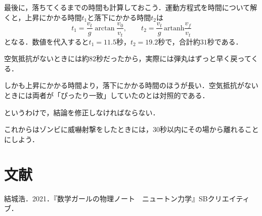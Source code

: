 \documentclass[a4paper,12pt]{jarticle}
\theoremstyle{definition}%
\newcommand{\bib}{\hangafter=1\hangindent=11mm\noindent}
\begin{document}
最後に，落ちてくるまでの時間も計算しておこう．運動方程式を時間について解くと，上昇にかかる時間$t_1$と落下にかかる時間$t_2$は
\[
t_1=\frac{v_t}{g}\arctan\frac{v_0}{v_t}, \qquad
t_2=\frac{v_t}{g}\,\mathrm{artanh}\frac{v_f}{v_t}
\]
となる．数値を代入すると$t_1=11.5$秒，$t_2=19.2$秒で，合計約$31$秒である．

空気抵抗がないときには約$82$秒だったから，実際には弾丸はずっと早く戻ってくる．

しかも上昇にかかる時間より，落下にかかる時間のほうが長い．空気抵抗がないときには両者が「ぴったり一致」していたのとは対照的である．

というわけで，結論を修正しなければならない．

これからはゾンビに威嚇射撃をしたときには，30秒以内にその場から離れることにしよう．


\section*{文献}
\bib 結城浩．2021．『数学ガールの物理ノート　ニュートン力学』SBクリエイティブ．
\end{document}
